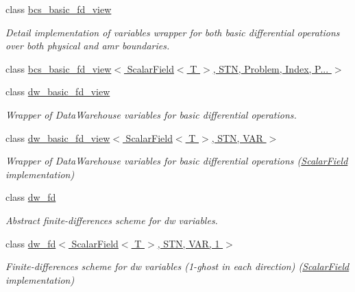 \begin{DoxyCompactItemize}
class \hyperlink{classUintah_1_1PhaseField_1_1detail_1_1bcs__basic__fd__view}{bcs\+\_\+basic\+\_\+fd\+\_\+view}
\begin{DoxyCompactList}\small\item\em Detail implementation of variables wrapper for both basic differential operations over both physical and amr boundaries. \end{DoxyCompactList}\item 
class \hyperlink{classUintah_1_1PhaseField_1_1detail_1_1bcs__basic__fd__view_3_01ScalarField_3_01T_01_4_00_01STN_07caa9955adf783da0505eac75e76f08}{bcs\+\_\+basic\+\_\+fd\+\_\+view$<$ Scalar\+Field$<$ T $>$, S\+T\+N, Problem, Index, P... $>$}
\item 
class \hyperlink{classUintah_1_1PhaseField_1_1detail_1_1dw__basic__fd__view}{dw\+\_\+basic\+\_\+fd\+\_\+view}
\begin{DoxyCompactList}\small\item\em Wrapper of Data\+Warehouse variables for basic differential operations. \end{DoxyCompactList}\item 
class \hyperlink{classUintah_1_1PhaseField_1_1detail_1_1dw__basic__fd__view_3_01ScalarField_3_01T_01_4_00_01STN_00_01VAR_01_4}{dw\+\_\+basic\+\_\+fd\+\_\+view$<$ Scalar\+Field$<$ T $>$, S\+T\+N, V\+A\+R $>$}
\begin{DoxyCompactList}\small\item\em Wrapper of Data\+Warehouse variables for basic differential operations (\hyperlink{structUintah_1_1PhaseField_1_1ScalarField}{Scalar\+Field} implementation) \end{DoxyCompactList}\item 
class \hyperlink{classUintah_1_1PhaseField_1_1detail_1_1dw__fd}{dw\+\_\+fd}
\begin{DoxyCompactList}\small\item\em Abstract finite-\/differences scheme for dw variables. \end{DoxyCompactList}\item 
class \hyperlink{classUintah_1_1PhaseField_1_1detail_1_1dw__fd_3_01ScalarField_3_01T_01_4_00_01STN_00_01VAR_00_011_01_4}{dw\+\_\+fd$<$ Scalar\+Field$<$ T $>$, S\+T\+N, V\+A\+R, 1 $>$}
\begin{DoxyCompactList}\small\item\em Finite-\/differences scheme for dw variables (1-\/ghost in each direction) (\hyperlink{structUintah_1_1PhaseField_1_1ScalarField}{Scalar\+Field} implementation) \end{DoxyCompactList}\item 

\end{DoxyCompactItemize}
